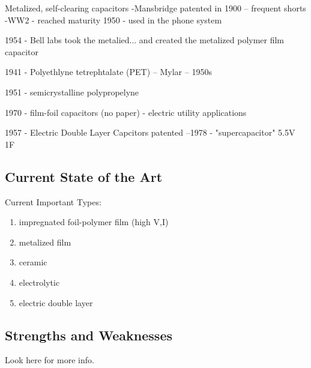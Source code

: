Metalized, self-clearing capacitors
-Mansbridge patented in 1900 -- frequent shorts
-WW2 - reached maturity
1950 - used in the phone system

1954 - Bell labs took the metalied... and created the metalized polymer film capacitor

1941 - Polyethlyne  tetrephtalate (PET) -- Mylar -- 1950s

1951 -  semicrystalline polypropelyne 

1970 - film-foil capacitors (no paper) - electric utility applications

1957 - Electric Double Layer Capcitors patented
--1978  - "supercapacitor" 5.5V 1F \cite{deis_hist}

\subsection{Current State of the Art}

Current Important Types: \cite{deis_hist}
\begin{enumerate}
    \item impregnated foil-polymer film (high V,I)
    \item metalized film
    \item ceramic
    \item electrolytic
    \item electric double layer
\end{enumerate}

\subsection{Strengths and Weaknesses}
Look here for more info. \cite{deis_hist}
